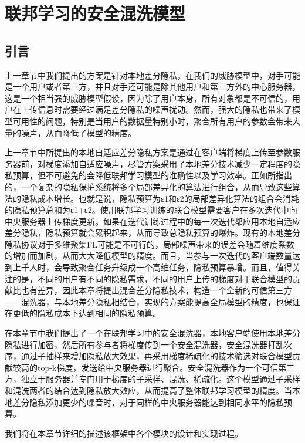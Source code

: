 \chapter{联邦学习的安全混洗模型}
\label{ch4}
\section{引言}
上一章节中我们提出的方案是针对本地差分隐私，在我们的威胁模型中，对手可能是一个用户或者第三方，并且对手还可能是除其他用户和第三方外的中心服务器，这是一个相当强的威胁模型假设，因为除了用户本身，所有对象都是不可信的，用户在上传信息时需要经过满足差分隐私的噪声扰动。然而，强大的隐私也带来了模型可用性的问题，特别是当用户的数据量特别小时，聚合所有用户的参数会带来大量的噪声，从而降低了模型的精度。

上一章节中所提出的本地自适应差分隐私方案是通过在客户端将梯度上传至参数服务器前，对梯度添加自适应噪声，尽管方案采用了本地差分技术减少一定程度的隐私预算，但不可避免的会降低联邦学习模型的准确性以及学习效率。正如所指出的，一个复杂的隐私保护系统将多个局部差异化的算法进行组合，从而导致这些算法的隐私成本增长。也就是说，隐私预算为ε1和ε2的局部差异化算法的组合会消耗的隐私预算总和为ε1+ε2。使用联邦学习训练的联合模型需要客户在多次迭代中向中央服务器上传梯度更新。如果在迭代训练过程中的每一次迭代都应用本地自适应差分隐私，隐私预算就会累积起来，从而导致总隐私预算的爆炸。现有的本地差分隐私协议对于多维聚集FL可能是不可行的，局部噪声带来的误差会随着维度系数的增加而加剧，从而大大降低模型的精度。而且，当参与一次迭代的客户端数量达到上千人时，会导致聚合任务升级成一个高维任务，隐私预算暴增。而且，值得关注的是，不同的用户有不同的隐私需求，不同的用户上传的梯度对于联合模型的贡献比也有差异，因此本章将提出混合差分隐私技术，构造一个全新的可信第三方——混洗器，与本地差分隐私相结合，实现的方案能提高全局模型的精度，也保证在更低的隐私成本下达到相同的隐私预算。

在本章节中我们提出了一个在联邦学习中的安全混洗器，本地客户端使用本地差分隐私进行加密，然后所有参与者将梯度传到一个安全混洗器，安全混洗器打乱次序，通过子抽样来增加隐私放大效果，再采用梯度稀疏化的技术筛选对联合模型贡献较高的top-k梯度，发送给中央服务器进行聚合。安全混洗器作为一个可信第三方，独立于服务器并专门用于梯度的子采样、混洗、稀疏化。这个模型通过子采样和混洗两者的结合达到隐私放大效应，从而提高了整体联邦学习模型的精度。当本地差分隐私添加更少的噪音时，对于同样的中央服务器能达到相同水平的隐私预算。

我们将在本章节详细的描述该框架中各个模块的设计和实现过程。

